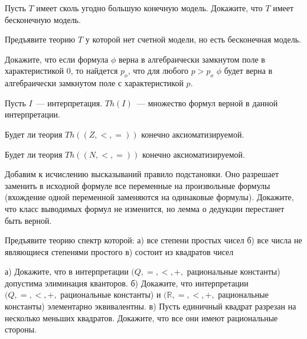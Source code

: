 \setcounter{curtask}{36}


\begin{task}
    Пусть $T$ имеет сколь угодно большую конечную модель. Докажите, что $T$ имеет
    бесконечную модель.
\end{task}

\begin{task}
    Предъявите теорию $T$ у которой нет счетной модели, но есть бесконечная модель.
\end{task}

\begin{task}
    Докажите, что если формула $\phi$ верна в алгебраически замкнутом
    поле в характеристикой $0$, то найдется $p_o$, что для любого $p >
    p_o$ $\phi$ будет верна в алгебраически замкнутом поле с
    характеристикой $p$.
\end{task}


Пусть $I$~--- интерпретация. $Th(I)$~--- множество формул верной в
данной интерпретации.

\begin{task}
    Будет ли теория $Th((Z, <, =))$ конечно аксиоматизируемой.
\end{task}

\begin{task}
    Будет ли теория $Th((N, <, =))$ конечно аксиоматизируемой.
\end{task}


\breakline


\begin{ptask}{20}
    Добавим к исчислению высказываний правило подстановки. Оно разрешает заменить в
    исходной формуле все переменные на произвольные формулы (вхождение одной
    переменной заменяются на одинаковые формулы). Докажите, что класс выводимых
    формул не изменится, но лемма о дедукции перестанет быть верной. 
\end{ptask}


\begin{ptask}{23}
    Предъявите теорию спектр которой:
    а) все степени простых чисел
    б) все числа не являющиеся степенями простого
    в) состоит из квадратов чисел
\end{ptask}

\begin{ptask}{31}
    а) Докажите, что в интерпретации $(Q, =, <, +,$ рациональные
    константы) допустима элиминация кванторов.
    б) Докажите, что интерпретации $(Q, =, <, +,$ рациональные
    константы) и $(\mathbb{R}, =, <, +,$ рациональные константы)
    элементарно эквивалентны.
    в) Пусть единичный квадрат разрезан на несколько меньших
    квадратов. Докажите, что все они имеют рациональные стороны.
\end{ptask}
